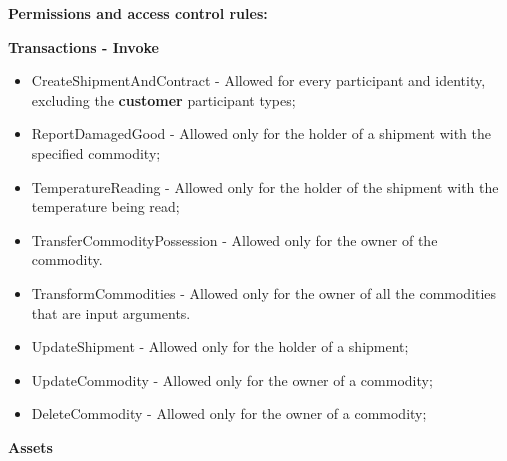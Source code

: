 \textbf{Permissions and access control rules:}
\par
\par \textbf{Transactions - Invoke}
        \begin{itemize}
		\item CreateShipmentAndContract - Allowed for every participant and identity, excluding the \textbf{customer} participant types;
		\item ReportDamagedGood - Allowed only for the holder of a shipment with the specified commodity;
		\item TemperatureReading - Allowed only for the holder of the shipment with the temperature being read; %
		\item TransferCommodityPossession - Allowed only for the owner of the commodity.%
		\item TransformCommodities - Allowed only for the owner of all the commodities that are input arguments. %
		\item UpdateShipment - Allowed only for the holder of a shipment;
		\item UpdateCommodity - Allowed only for the owner of a commodity;
		\item DeleteCommodity - Allowed only for the owner of a commodity;
		\end{itemize}
    \par \textbf{Assets}
